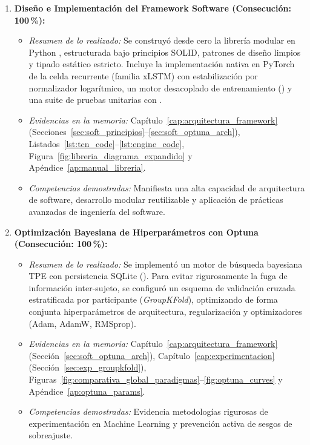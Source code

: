 \begin{enumerate}[label=\textbf{OE\arabic*.}, leftmargin=1.8cm]
    \item \textbf{Diseño e Implementación del Framework Software  (Consecución: 100\,\%):}
    \begin{itemize}
        \item \textit{Resumen de lo realizado:} Se construyó desde cero la librería modular en Python , estructurada bajo principios SOLID, patrones de diseño limpios y tipado estático estricto. Incluye la implementación nativa en PyTorch de la celda recurrente \slstm{} (familia xLSTM) con estabilización por normalizador logarítmico, un motor desacoplado de entrenamiento () y una suite de pruebas unitarias con .
        \item \textit{Evidencias en la memoria:} Capítulo~\ref{cap:arquitectura_framework} (Secciones~\ref{sec:soft_principios}--\ref{sec:soft_optuna_arch}), Listados~\ref{lst:tcn_code}--\ref{lst:engine_code}, Figura~\ref{fig:libreria_diagrama_expandido} y Apéndice~\ref{ap:manual_libreria}.
        \item \textit{Competencias demostradas:} Manifiesta una alta capacidad de arquitectura de software, desarrollo modular reutilizable y aplicación de prácticas avanzadas de ingeniería del software.
    \end{itemize}

    \item \textbf{Optimización Bayesiana de Hiperparámetros con Optuna (Consecución: 100\,\%):}
    \begin{itemize}
        \item \textit{Resumen de lo realizado:} Se implementó un motor de búsqueda bayesiana TPE con persistencia SQLite (). Para evitar rigurosamente la fuga de información inter-sujeto, se configuró un esquema de validación cruzada estratificada por participante (\textit{GroupKFold}), optimizando de forma conjunta hiperparámetros de arquitectura, regularización y optimizadores (Adam, AdamW, RMSprop).
        \item \textit{Evidencias en la memoria:} Capítulo~\ref{cap:arquitectura_framework} (Sección~\ref{sec:soft_optuna_arch}), Capítulo~\ref{cap:experimentacion} (Sección~\ref{sec:exp_groupkfold}), Figuras~\ref{fig:comparativa_global_paradigmas}--\ref{fig:optuna_curves} y Apéndice~\ref{ap:optuna_params}.
        \item \textit{Competencias demostradas:} Evidencia metodologías rigurosas de experimentación en Machine Learning y prevención activa de sesgos de sobreajuste.
    \end{itemize}


\end{enumerate}
